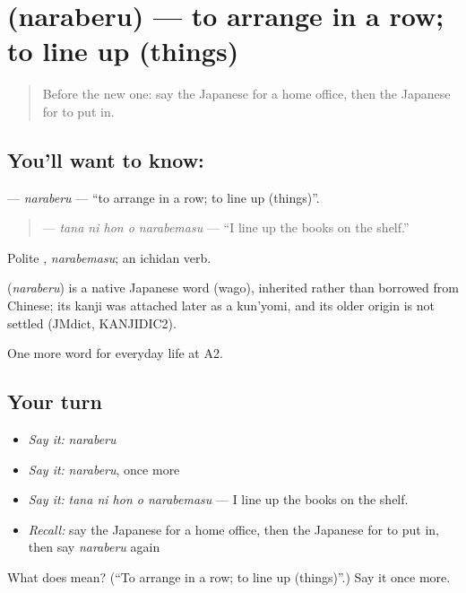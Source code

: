 \section[\texorpdfstring{\ja{ならべる} (naraberu)}{ならべる (naraberu)}]{ (naraberu) — to arrange in a row; to line up (things)}

\label{lesson:JA-C156-naraberu}



\begin{quote}
Before the new one: say the Japanese for a home office, then the Japanese for to put in.
\end{quote}

\subsection*{You'll want to know: }
\textbf{} — \emph{naraberu} — \textquotedblleft{}to arrange in a row; to line up (things)\textquotedblright{}.

\begin{quote}
\textbf{  } — \emph{tana ni hon o narabemasu} — \textquotedblleft{}I line up the books on the shelf.\textquotedblright{}
\end{quote}

Polite \textbf{}, \emph{narabemasu}; an ichidan verb.

\begin{cousinweb}
\textbf{} (\emph{naraberu}) is a native Japanese word (wago), inherited rather than borrowed from Chinese; its kanji was attached later as a kun'yomi, and its older origin is not settled (JMdict, KANJIDIC2).
\end{cousinweb}

\begin{grammarlens}[title={What you've built}]
One more word for everyday life at A2.
\end{grammarlens}

\subsection*{Your turn}
\begin{itemize}
\raggedright
  \item \emph{Say it:} \emph{naraberu}
  \item \emph{Say it:} \emph{naraberu}, once more
  \item \emph{Say it:} \emph{tana ni hon o narabemasu} — I line up the books on the shelf.
  \item \emph{Recall:} say the Japanese for a home office, then the Japanese for to put in, then say \emph{naraberu} again
\end{itemize}

\begin{tcolorbox}[breakable,colback=teal!4,colframe=teal!35!black,title={Before you move on}]
What does  mean? (\textquotedblleft{}To arrange in a row; to line up (things)\textquotedblright{}.) Say it once more.
\end{tcolorbox}
